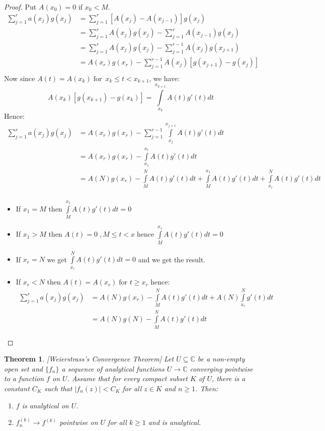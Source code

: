 \documentclass[12pt]{article}
\newtheorem{thm}{Theorem}
\begin{document}
\begin{proof}
Put $A(x_0) = 0$ if $x_0 < M$.
\begin{align*}
	\sum\limits_{j=1}^{r} a(x_j)g(x_j)
	&= \sum\limits_{j=1}^{r} \left[A(x_j) - A(x_{j-1})\right] g(x_j) \\
	&= \sum\limits_{j=1}^{r} A(x_j) g(x_j) - \sum\limits_{j=1}^{r} A(x_{j-1}) g(x_j) \\
	&= \sum\limits_{j=1}^{r} A(x_j) g(x_j) - \sum\limits_{j=1}^{r - 1} A(x_{j}) g(x_{j + 1}) \\
	&= A(x_r) g(x_r) - \sum\limits_{j=1}^{r - 1} A(x_{j}) \left[ g(x_{j + 1}) - g(x_j) \right] \\
\end{align*}
Now since $A(t) = A(x_k) \; \text{for } \, x_k \le t < x_{k + 1}$, we have:
$$
A(x_k) \left[ g(x_{k + 1}) - g(x_k)\right] = \int\limits_{x_k}^{x_{k + 1}} A(t) g'(t) dt
$$
Hence:
\begin{align*}
\sum\limits_{j=1}^{r} a(x_j)g(x_j)
&= A(x_r) g(x_r) - \sum\limits_{j=1}^{r - 1} \int\limits_{x_j}^{x_{j + 1}} A(t) g'(t) dt \\
&= A(x_r) g(x_r) - \int\limits_{x_1}^{x_r} A(t) g'(t) dt \\
&= A(N) g(x_r) - \int\limits_{M}^{N} A(t) g'(t) dt + \int\limits_{M}^{x_1} A(t) g'(t) dt + \int\limits_{x_r}^{N} A(t) g'(t) dt \\
\end{align*}

\begin{itemize}
	\item If $x_1 = M$ then $\int\limits_{M}^{x_1} A(t) g'(t) dt=0$
	\item If $x_1 > M$ then $A(t) = 0 \;, M \le t < x \; \text{hence } \int\limits_{M}^{x_1} A(t) g'(t) dt=0$
	\item If $x_r = N$ we get $\int\limits_{x_r}^{N} A(t) g'(t) dt=0$ and we get the result.
	\item If $x_r < N$ then $A(t) = A(x_r) \; \text{for } t \ge x_r$ hence:
		\begin{align*}
\sum\limits_{j=1}^{r} a(x_j)g(x_j)
&= A(N) g(x_r) - \int\limits_{M}^{N} A(t) g'(t) dt + A(N) \int\limits_{x_r}^{N} g'(t) dt \\
&= A(N) g(N) - \int\limits_{M}^{N} A(t) g'(t) dt
		\end{align*}
\end{itemize}
\end{proof}

\begin{thm}\label{wei:conv}[Weierstrass's Convergence Theorem]
Let $U \subseteq \mathbb{C}$ be a non-empty open set and $\{f_n\}$ a sequence of analytical functions $U \to \mathbb{C}$ converging pointwise to a function $f$ on $U$. Assume that for every compact subset $K$ of $U$, there is a constant $C_K$ such that $|f_n(z)| < C_K$ for all $z \in K$ and $n \ge 1$. Then:
\begin{enumerate}
	\item $f$ is analytical on $U$.
	\item $f_n^{(k)} \to f^{(k)}$ pointwise on $U$ for all $k \ge 1$ and is analytical.
\end{enumerate}
\end{thm}
\end{document}
